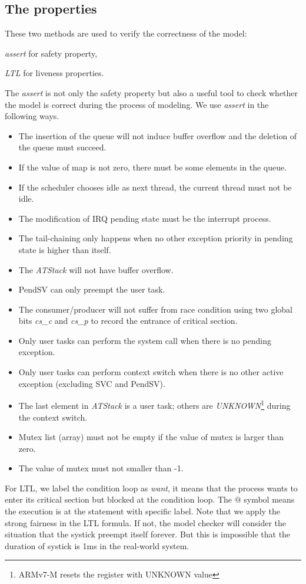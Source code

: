 \subsection{The properties} These two methods are used to verify the correctness of the model:
\begin{enumerate*}[label={\roman*)},font={\bfseries}]
\item \textit{assert} for safety property,
\item \textit{LTL} for liveness properties.
\end{enumerate*}
The \textit{assert} is not only the safety property but also a useful tool to check whether the model is correct during the process of modeling. We use \textit{assert} in the following ways.
\begin{itemize}
\item The insertion of the queue will not induce buffer overflow and the deletion of the queue must succeed.
\item If the value of map is not zero, there must be some elements in the queue.
\item If the scheduler chooses idle as next thread, the current thread must not be idle.
\item The modification of IRQ pending state must be the interrupt process.
\item The tail-chaining only happens when no other exception priority in pending state is higher than itself.
\item The \textit{ATStack} will not have buffer overflow.
\item PendSV can only preempt the user task.
\item The consumer/producer will not suffer from race condition using two global bits \textit{cs\_c} and \textit{cs\_p} to record the entrance of critical section.
\item Only user tasks can perform the system call when there is no pending exception.
\item Only user tasks can perform context switch when there is no other active exception (excluding SVC and PendSV).
\item The last element in \textit{ATStack} is a user task; others are \textit{UNKNOWN}\footnote{ARMv7-M resets the register with UNKNOWN value} during the context switch.
\item Mutex list (array) must not be empty if the value of mutex is larger than zero.
\item The value of mutex must not smaller than -1.
\end{itemize}
For LTL, we label the condition loop as \textit{want}, it means that the process wants to enter its critical section but blocked at the condition loop. The $@$ symbol means the execution is at the statement with specific label. Note that we apply the strong fairness in the LTL formula. If not, the model checker will consider the situation that the systick preempt itself forever. But this is impossible that the duration of systick is 1ms in the real-world system.

